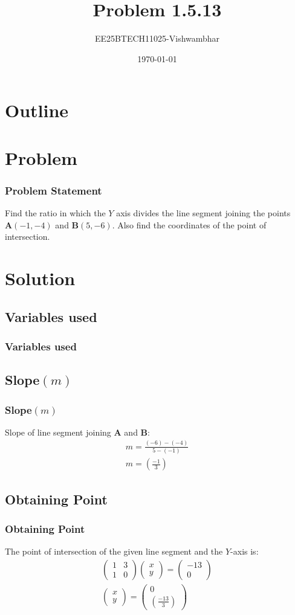 \documentclass{beamer}
\title{Problem 1.5.13}
\author{EE25BTECH11025-Vishwambhar}
\date{\today}
\providecommand{\brak}[1]{\ensuremath{\left(#1\right)}}
\theoremstyle{remark}
\newcommand{\myvec}[1]{\ensuremath{\begin{pmatrix}#1\end{pmatrix}}}
\let\vec\mathbf
\numberwithin{equation}{section}
\begin{document}
\begin{frame}
\titlepage
\end{frame}

\section*{Outline}
\begin{frame}
\tableofcontents
\end{frame}
\section{Problem}
\begin{frame}
\frametitle{Problem Statement}
Find the ratio in which the $Y$ axis divides the line segment joining the points $\vec{A}\brak{-1,-4}$ and $\vec{B}\brak{5,-6}$. Also find the coordinates of the point of intersection.\\
\end{frame}

\section{Solution}

\subsection{Variables used}
\begin{frame}
\frametitle{Variables used}

\end{frame}

\subsection{Slope$\brak{m}$}
\begin{frame}
\frametitle{Slope$\brak{m}$}
Slope of line segment joining $\vec{A}$ and $\vec{B}$:\\
\begin{align}
m=\frac{\brak{-6}-\brak{-4}}{5-\brak{-1}}\\
m=\brak{\frac{-1}{3}}
\end{align}
\end{frame}

\subsection{Obtaining Point}
\begin{frame}
\frametitle{Obtaining Point}
The point of intersection of the given line segment and the $Y$-axis is:\\
\begin{align}
\myvec{1&3\\1&0}\myvec{x\\y}=\myvec{-13\\0}\\
\myvec{x\\y}=\myvec{0\\\brak{\frac{-13}{3}}}
\end{align}
\end{frame}
\end{document}
